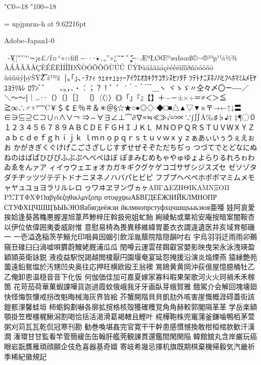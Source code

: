 %
%
%
%
\kcatcode"C0=18%
\kcatcode"100=18%

\font\upjpnrm = upjpnrm-h at 9.62216pt
\upjpnrm


Adobe-Japan1-0

 ‑¥̲̀¦˜̃ʼ’ʻ‘∼¡¢£⁄ƒ¤“«‹›ﬁﬂ
‒–·∙•‚„”»¿́ˆ̂¯̄̆̇̈˚̊¸̧̨̋̌
̶—ÆªŁØŒºæıłøœß­©¬®²³µ¹¼½¾
ÀÁÂÃÄÅÇÈÉÊËÌÍÎÏÐÑÒÓÔÕÖÙÚÛ
ÜÝÞàáâãäåçèéêëìíîïðñòóôõö
ùúûüýþÿŠŸŽ̅‾š™ž ￨｡｢｣､･ｦｧｨ
ｩｪｫｬｭｮｯｰｱｲｳｴｵｶｷｸｹｺｻｼｽｾｿﾀﾁ
ﾂﾃﾄﾅﾆﾇﾈﾉﾊﾋﾌﾍﾎﾏﾐﾑﾒﾓﾔﾕﾖﾗﾘﾙﾚ
ﾛﾜﾝﾞﾟ 　、。，．・：；？！゛゜´｀¨＾￣＿ヽ
ヾゝゞ〃仝々〆〇ー―‐／＼〜～‖｜…‥（）〔〕［］
｛｝〈〈〉〉《》「」『』【】＋−－±×÷＝≠＜＞≦
≧∞∴♂♀°′″℃￥＄￠￡％＃＆＊＠§☆★○●◎◇
◆□■△▲▽▼※〒→←↑↓〓∈∋⊆⊇⊂⊃∪∩∧∨￢
⇒⇔∀∃∠⊥⌒∂∇≡≒≪≫√∽∝∵∫∬Å‰♯♭♪†
‡¶◯０１２３４５６７８９ＡＢＣＤＥＦＧＨＩＪＫＬ
ＭＮＯＰＱＲＳＴＵＶＷＸＹＺａｂｃｄｅｆｇｈｉｊｋ
ｌｍｎｏｐｑｒｓｔｕｖｗｘｙｚぁあぃいぅうぇえぉお
かがきぎくぐけげこごさざしじすずせぜそぞただちぢっ
つづてでとどなにぬねのはばぱひびぴふぶぷへべぺほぼ
ぽまみむめもゃやゅゆょよらりるれろゎわゐゑをんァア
ィイゥウェエォオカガキギクグケゲコゴサザシジスズセ
ゼソゾタダチヂッツヅテデトドナニヌネノハバパヒビピ
フブプヘベペホボポマミムメモャヤュユョヨラリルレロ
ヮワヰヱヲンヴヵヶΑΒΓΔΕΖΗΘΙΚΛΜΝΞΟΠ
ΡΣΤΥΦΧΨΩαβγδεζηθικλμνξοπρ
στυφχψωАБВГДЕЁЖЗИЙКЛМНОПР
СТУФХЦЧШЩЪЫЬЭЮЯабвгдеёжзи
йклмнопрстуфхцчшщъыьэюя亜唖
娃阿哀愛挨姶逢葵茜穐悪握渥旭葦芦鯵梓圧斡扱宛姐虻飴
絢綾鮎或粟袷安庵按暗案闇鞍杏以伊位依偉囲夷委威尉惟
意慰易椅為畏異移維緯胃萎⾐衣謂違遺医井亥域育郁磯⼀
一壱溢逸稲茨芋鰯允印咽員因姻引飲淫胤蔭院陰隠韻吋右
宇烏⽻羽迂⾬雨卯鵜窺丑碓⾅臼渦嘘唄欝蔚鰻姥厩浦⽠瓜
閏噂云運雲荏餌叡営嬰影映曳栄永泳洩瑛盈穎頴英衛詠鋭
液疫益駅悦謁越閲榎厭円園堰奄宴延怨掩援沿演炎焔煙燕
猿縁艶苑薗遠鉛鴛塩於汚甥凹央奥往応押旺横欧殴王翁襖
鴬鴎⻩黄岡沖荻億屋憶臆桶牡⼄乙俺卸恩温穏⾳音下化仮
何伽価佳加可嘉夏嫁家寡科暇果架歌河⽕火珂禍⽲禾稼箇
花苛茄荷華菓蝦課嘩貨迦過霞蚊俄峨我⽛牙画臥芽蛾賀雅
餓駕介会解回塊壊廻快怪悔恢懐戒拐改魁晦械海灰界皆絵
芥蟹開階⾙貝凱劾外咳害崖慨概涯碍蓋街該鎧骸浬馨蛙垣
柿蛎鈎劃嚇各廓拡撹格核殻獲確穫覚⾓角赫較郭閣隔⾰革
学岳楽額顎掛笠樫橿梶鰍潟割喝恰括活渇滑葛褐轄且鰹叶
椛樺鞄株兜竃蒲釜鎌噛鴨栢茅萱粥刈苅⽡瓦乾侃冠寒刊勘
勧巻喚堪姦完官寛⼲干幹患感慣憾換敢柑桓棺款歓汗漢澗
潅環⽢甘監看竿管簡緩⽸缶翰肝艦莞観諌貫還鑑間閑関陥
韓館舘丸含岸巌玩癌眼岩翫贋雁頑顔願企伎危喜器基奇嬉
寄岐希幾忌揮机旗既期棋棄機帰毅気汽畿祈季稀紀徽規記
